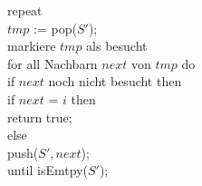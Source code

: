 \documentclass[11pt]{scrartcl} %
\begin{document}
\begin{compactenum}[(a)]
\begin{minipage}[t]{0.5em}
\begin{tabbing}
		\> repeat\\
		\>\> $tmp$ := pop($S'$);\\
		\>\> markiere $tmp$ als besucht\\
		\>\> for all Nachbarn $next$ von $tmp$ do\\
		\>\>\> if $next$ noch nicht besucht then\\
		\>\>\>\> if $next$ = $i$ then\\
		\>\>\>\>\> return true;\\
		\>\>\>\> else\\
		\>\>\>\>\> push($S',next$);\\
		\> until isEmtpy($S'$);
		\end{tabbing}
	\end{minipage}
\end{compactenum}
\end{document}
